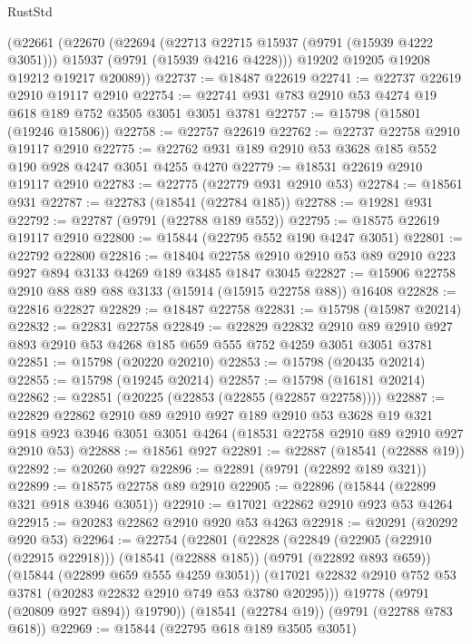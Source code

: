 \begin{lexlean}{RustStd}
\begin{coremodule}
    (@22661
      (@22670
        (@22694
          (@22713 @22715 @15937 (@9791 (@15939 @4222 @3051)))
          @15937
          (@9791 (@15939 @4216 @4228)))
        @19202
        @19205
        @19208
        @19212
        @19217
        @20089))
@22737 := @18487 @22619
@22741 := @22737 @22619 @2910 @19117 @2910
@22754 := @22741 @931 @783 @2910 @53 @4274 @19 @618 @189 @752 @3505 @3051 @3051 @3781
@22757 := @15798 (@15801 (@19246 @15806))
@22758 := @22757 @22619
@22762 := @22737 @22758 @2910 @19117 @2910
@22775 := @22762 @931 @189 @2910 @53 @3628 @185 @552 @190 @928 @4247 @3051 @4255 @4270
@22779 := @18531 @22619 @2910 @19117 @2910
@22783 := @22775 (@22779 @931 @2910 @53)
@22784 := @18561 @931
@22787 := @22783 (@18541 (@22784 @185))
@22788 := @19281 @931
@22792 := @22787 (@9791 (@22788 @189 @552))
@22795 := @18575 @22619 @19117 @2910
@22800 := @15844 (@22795 @552 @190 @4247 @3051)
@22801 := @22792 @22800
@22816 := @18404 @22758 @2910 @2910 @53 @89 @2910 @223 @927 @894 @3133 @4269 @189 @3485 @1847 @3045
@22827 := @15906 @22758 @2910 @88 @89 @88 @3133 (@15914 (@15915 @22758 @88)) @16408
@22828 := @22816 @22827
@22829 := @18487 @22758
@22831 := @15798 (@15987 @20214)
@22832 := @22831 @22758
@22849 := @22829
    @22832
    @2910
    @89
    @2910
    @927
    @893
    @2910
    @53
    @4268
    @185
    @659
    @555
    @752
    @4259
    @3051
    @3051
    @3781
@22851 := @15798 (@20220 @20210)
@22853 := @15798 (@20435 @20214)
@22855 := @15798 (@19245 @20214)
@22857 := @15798 (@16181 @20214)
@22862 := @22851 (@20225 (@22853 (@22855 (@22857 @22758))))
@22887 := @22829
    @22862
    @2910
    @89
    @2910
    @927
    @189
    @2910
    @53
    @3628
    @19
    @321
    @918
    @923
    @3946
    @3051
    @3051
    @4264
    (@18531 @22758 @2910 @89 @2910 @927 @2910 @53)
@22888 := @18561 @927
@22891 := @22887 (@18541 (@22888 @19))
@22892 := @20260 @927
@22896 := @22891 (@9791 (@22892 @189 @321))
@22899 := @18575 @22758 @89 @2910
@22905 := @22896 (@15844 (@22899 @321 @918 @3946 @3051))
@22910 := @17021 @22862 @2910 @923 @53 @4264
@22915 := @20283 @22862 @2910 @920 @53 @4263
@22918 := @20291 (@20292 @920 @53)
@22964 := @22754
    (@22801
      (@22828
        (@22849
          (@22905 (@22910 (@22915 @22918)))
          (@18541 (@22888 @185))
          (@9791 (@22892 @893 @659))
          (@15844 (@22899 @659 @555 @4259 @3051))
          (@17021 @22832 @2910 @752 @53 @3781 (@20283 @22832 @2910 @749 @53 @3780 @20295)))
        @19778
        (@9791 (@20809 @927 @894))
        @19790))
    (@18541 (@22784 @19))
    (@9791 (@22788 @783 @618))
@22969 := @15844 (@22795 @618 @189 @3505 @3051)

\end{coremodule}
\end{lexlean}
